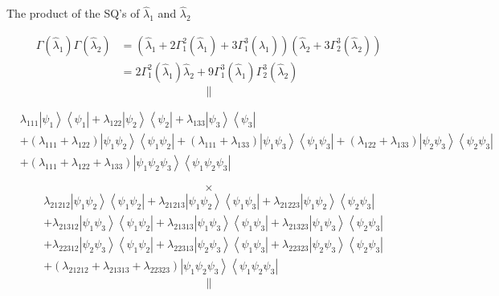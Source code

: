 \documentclass[aps,preprint]{revtex4}%
\begin{document}
\bigskip The product of the SQ's of $\hat{\lambda}_{1}$ and $\hat{\lambda}%
_{2}$%

\begin{align}
\Gamma\left(  \hat{\lambda}_{1}\right)  \Gamma\left(  \hat{\lambda}%
_{2}\right)    & =\left(  \hat{\lambda}_{1}+2\Gamma_{1}^{2}\left(
\hat{\lambda}_{1}\right)  +3\Gamma_{1}^{3}\left(  \hat{\lambda}_{1}\right)
\right)  \left(  \hat{\lambda}_{2}+3\Gamma_{2}^{3}\left(  \hat{\lambda}%
_{2}\right)  \right)  \nonumber\\
& =2\Gamma_{1}^{2}\left(  \hat{\lambda}_{1}\right)  \hat{\lambda}_{2}%
+9\Gamma_{1}^{3}\left(  \hat{\lambda}_{1}\right)  \Gamma_{2}^{3}\left(
\hat{\lambda}_{2}\right)
\end{align}%
\[
\parallel
\]
%

\begin{align}
& \lambda_{111}\left\vert \psi_{1}\right\rangle \left\langle \psi
_{1}\right\vert +\lambda_{122}\left\vert \psi_{2}\right\rangle \left\langle
\psi_{2}\right\vert +\lambda_{133}\left\vert \psi_{3}\right\rangle
\left\langle \psi_{3}\right\vert \nonumber\\
& +\left(  \lambda_{111}+\lambda_{122}\right)  \left\vert \psi_{1}\psi
_{2}\right\rangle \left\langle \psi_{1}\psi_{2}\right\vert +\left(
\lambda_{111}+\lambda_{133}\right)  \left\vert \psi_{1}\psi_{3}\right\rangle
\left\langle \psi_{1}\psi_{3}\right\vert +\left(  \lambda_{122}+\lambda
_{133}\right)  \left\vert \psi_{2}\psi_{3}\right\rangle \left\langle \psi
_{2}\psi_{3}\right\vert \nonumber\\
& +\left(  \lambda_{111}+\lambda_{122}+\lambda_{133}\right)  \left\vert
\psi_{1}\psi_{2}\psi_{3}\right\rangle \left\langle \psi_{1}\psi_{2}\psi
_{3}\right\vert
\end{align}
%

\[
\times
\]%
\begin{align}
& \lambda_{21212}\left\vert \psi_{1}\psi_{2}\right\rangle \left\langle
\psi_{1}\psi_{2}\right\vert +\lambda_{21213}\left\vert \psi_{1}\psi
_{2}\right\rangle \left\langle \psi_{1}\psi_{3}\right\vert +\lambda
_{21223}\left\vert \psi_{1}\psi_{2}\right\rangle \left\langle \psi_{2}\psi
_{3}\right\vert \nonumber\\
& +\lambda_{21312}\left\vert \psi_{1}\psi_{3}\right\rangle \left\langle
\psi_{1}\psi_{2}\right\vert +\lambda_{21313}\left\vert \psi_{1}\psi
_{3}\right\rangle \left\langle \psi_{1}\psi_{3}\right\vert +\lambda
_{21323}\left\vert \psi_{1}\psi_{3}\right\rangle \left\langle \psi_{2}\psi
_{3}\right\vert \nonumber\\
& +\lambda_{22312}\left\vert \psi_{2}\psi_{3}\right\rangle \left\langle
\psi_{1}\psi_{2}\right\vert +\lambda_{22313}\left\vert \psi_{2}\psi
_{3}\right\rangle \left\langle \psi_{1}\psi_{3}\right\vert +\lambda
_{22323}\left\vert \psi_{2}\psi_{3}\right\rangle \left\langle \psi_{2}\psi
_{3}\right\vert \nonumber\\
& +\left(  \lambda_{21212}+\lambda_{21313}+\lambda_{22323}\right)  \left\vert
\psi_{1}\psi_{2}\psi_{3}\right\rangle \left\langle \psi_{1}\psi_{2}\psi
_{3}\right\vert
\end{align}%
\[
\parallel
\]
%
\end{document}
